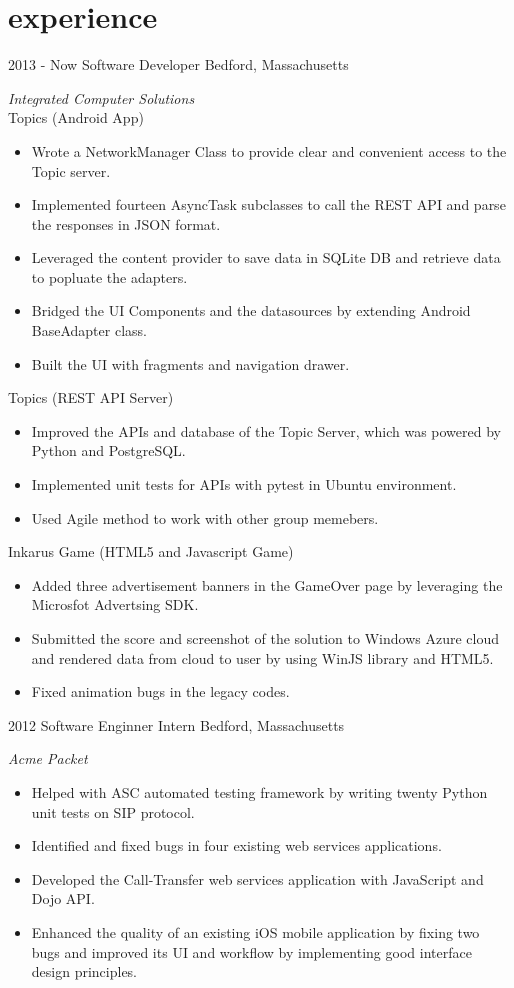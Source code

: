 \documentclass[]{ly-cv} %
\begin{document}
\section{experience}
\begin{entrylist}
\entry
{2013 - Now}
{Software Developer}
{Bedford, Massachusetts}
{\emph{Integrated Computer Solutions}\vspace{1mm}\\
Topics (Android App)
\begin{itemize}
  \item Wrote a NetworkManager Class to provide clear and convenient access to the Topic server.
  \item Implemented fourteen AsyncTask subclasses to call the REST API and parse the responses in JSON format.
  \item Leveraged the content provider to save data in SQLite DB and retrieve data to popluate the adapters.
  \item Bridged the UI Components and the datasources by extending Android BaseAdapter class.
  \item Built the UI with fragments and navigation drawer.
\end{itemize}
Topics (REST API Server)
\begin{itemize}
  \item Improved the APIs and database of the Topic Server, which was powered by Python and PostgreSQL.
  \item Implemented unit tests for APIs with pytest in Ubuntu environment.
  \item Used Agile method to work with other group memebers.
\end{itemize}
Inkarus Game (HTML5 and Javascript Game)
\begin{itemize}
  \item Added three advertisement banners in the GameOver page by leveraging the Microsfot Advertsing SDK.
  \item Submitted the score and screenshot of the solution to Windows Azure cloud and rendered data from cloud to user by using WinJS library and HTML5.
  \item Fixed animation bugs in the legacy codes.
\end{itemize}}
\entry
{2012}
{Software Enginner Intern}
{Bedford, Massachusetts}
{\emph{Acme Packet}
\begin{itemize}
  \item Helped with ASC automated testing framework by writing twenty Python unit tests on SIP protocol.
	\item Identified and fixed bugs in four existing web services applications.
  \item Developed the Call-Transfer web services application with JavaScript and Dojo API.
  \item Enhanced the quality of an existing iOS mobile application by fixing two bugs and improved its UI and workflow by implementing good interface design principles.
\end{itemize}}
\end{entrylist}
\end{document}
